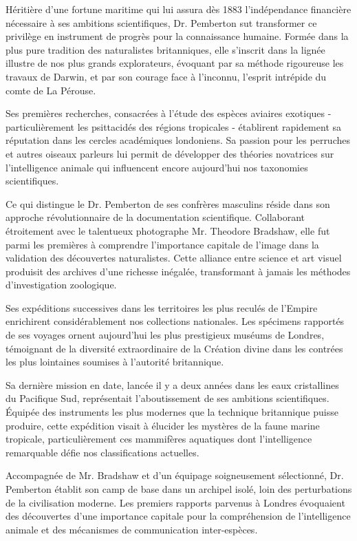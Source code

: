 \documentclass{news}
\begin{document}
Héritière d'une fortune maritime qui lui assura dès 1883 l'indépendance financière nécessaire à ses ambitions scientifiques, Dr. Pemberton sut transformer ce privilège en instrument de progrès pour la connaissance humaine. Formée dans la plus pure tradition des naturalistes britanniques, elle s'inscrit dans la lignée illustre de nos plus grands explorateurs, évoquant par sa méthode rigoureuse les travaux de Darwin, et par son courage face à l'inconnu, l'esprit intrépide du comte de La Pérouse.

Ses premières recherches, consacrées à l'étude des espèces aviaires exotiques - particulièrement les psittacidés des régions tropicales - établirent rapidement sa réputation dans les cercles académiques londoniens. Sa passion pour les perruches et autres oiseaux parleurs lui permit de développer des théories novatrices sur l'intelligence animale qui influencent encore aujourd'hui nos taxonomies scientifiques.

Ce qui distingue le Dr. Pemberton de ses confrères masculins réside dans son approche révolutionnaire de la documentation scientifique. Collaborant étroitement avec le talentueux photographe Mr. Theodore Bradshaw, elle fut parmi les premières à comprendre l'importance capitale de l'image dans la validation des découvertes naturalistes. Cette alliance entre science et art visuel produisit des archives d'une richesse inégalée, transformant à jamais les méthodes d'investigation zoologique.

Ses expéditions successives dans les territoires les plus reculés de l'Empire enrichirent considérablement nos collections nationales. Les spécimens rapportés de ses voyages ornent aujourd'hui les plus prestigieux muséums de Londres, témoignant de la diversité extraordinaire de la Création divine dans les contrées les plus lointaines soumises à l'autorité britannique.

Sa dernière mission en date, lancée il y a deux années dans les eaux cristallines du Pacifique Sud, représentait l'aboutissement de ses ambitions scientifiques. Équipée des instruments les plus modernes que la technique britannique puisse produire, cette expédition visait à élucider les mystères de la faune marine tropicale, particulièrement ces mammifères aquatiques dont l'intelligence remarquable défie nos classifications actuelles.

Accompagnée de Mr. Bradshaw et d'un équipage soigneusement sélectionné, Dr. Pemberton établit son camp de base dans un archipel isolé, loin des perturbations de la civilisation moderne. Les premiers rapports parvenus à Londres évoquaient des découvertes d'une importance capitale pour la compréhension de l'intelligence animale et des mécanismes de communication inter-espèces.
\end{document}
